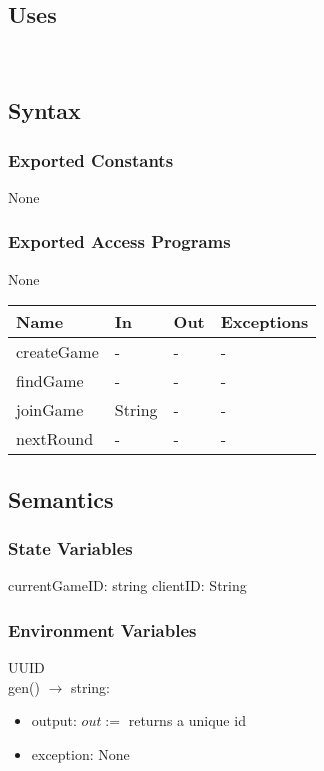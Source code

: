 \documentclass[12pt, titlepage]{article}
\begin{document}
\subsection{Uses}

 \\

\subsection{Syntax}


\subsubsection{Exported Constants}
None

\subsubsection{Exported Access Programs}
None

\begin{center}
\begin{tabular}{|p{2cm} | p{4cm} | p{4cm} | p{2cm} |}
\hline
\textbf{Name} & \textbf{In} & \textbf{Out} & \textbf{Exceptions} \\

\hline
createGame & - & - & - \\
\hline
findGame & - & - & - \\
\hline
joinGame & String & - & - \\
\hline
nextRound & - & - & - \\
\hline
\end{tabular}
\end{center}

\subsection{Semantics}

\subsubsection{State Variables}

currentGameID: string
clientID: String 

\subsubsection{Environment Variables}

UUID\\
gen() $\rightarrow$ string:
\begin{itemize}
    \item output: $out := $ returns a unique id
    \item exception:    None
\end{itemize}
\end{document}
